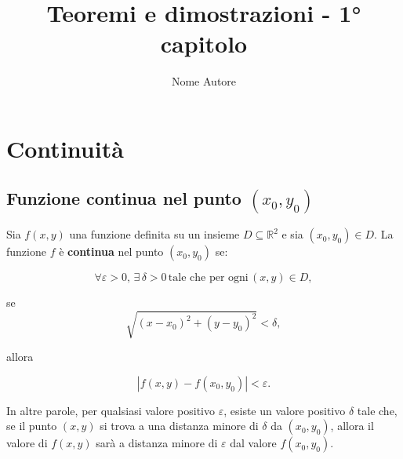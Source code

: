 \documentclass{article} %
\title{Teoremi e dimostrazioni - 1° capitolo} %
\author{Nome Autore} %
\begin{document}
\maketitle %

\section{Continuità}
\subsection{Funzione continua nel punto \( (x_0, y_0) \)}

Sia \( f(x, y) \) una funzione definita su un insieme \( D \subseteq \mathbb{R}^2 \) e sia \( (x_0, y_0) \in D \).
La funzione \( f \) è \textbf{continua} nel punto \( (x_0, y_0) \) se:

\[
\forall \varepsilon > 0, \, \exists \, \delta > 0 \, \text{tale che per ogni} \, (x, y) \in D,
\]

se
\[
\sqrt{(x - x_0)^2 + (y - y_0)^2} < \delta,
\]

allora

\[
|f(x, y) - f(x_0, y_0)| < \varepsilon.
\]

In altre parole, per qualsiasi valore positivo \( \varepsilon \), esiste un valore positivo \( \delta \) tale che, se il punto \( (x, y) \) si trova a una distanza minore di \( \delta \) da \( (x_0, y_0) \), allora il valore di \( f(x, y) \) sarà a distanza minore di \( \varepsilon \) dal valore \( f(x_0, y_0) \).
\end{document}
